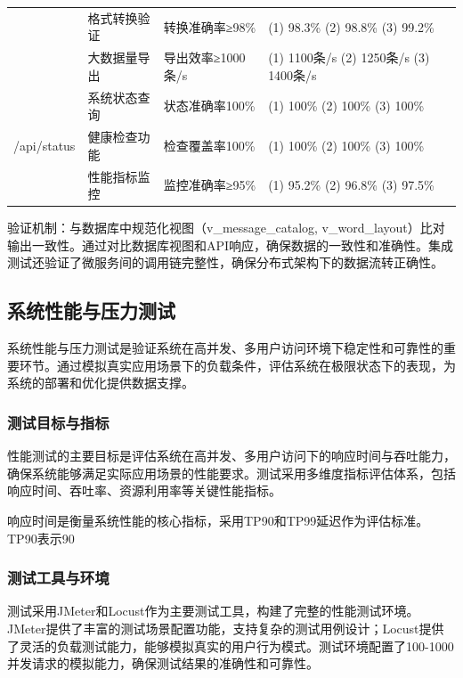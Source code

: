 \begin{table}[H]
{\begin{tabular}{|l|l|l|l|}
\cline{2-4}
& 格式转换验证 & 转换准确率≥98\% & (1) 98.3\% (2) 98.8\% (3) 99.2\% \\
\cline{2-4}
& 大数据量导出 & 导出效率≥1000条/s & (1) 1100条/s (2) 1250条/s (3) 1400条/s \\
\hline
\multirow{3}{*}{/api/status} & 系统状态查询 & 状态准确率100\% & (1) 100\% (2) 100\% (3) 100\% \\
\cline{2-4}
& 健康检查功能 & 检查覆盖率100\% & (1) 100\% (2) 100\% (3) 100\% \\
\cline{2-4}
& 性能指标监控 & 监控准确率≥95\% & (1) 95.2\% (2) 96.8\% (3) 97.5\% \\
\hline
\end{tabular}%
}
\end{table}

验证机制：与数据库中规范化视图（v\_message\_catalog, v\_word\_layout）比对输出一致性。通过对比数据库视图和API响应，确保数据的一致性和准确性。集成测试还验证了微服务间的调用链完整性，确保分布式架构下的数据流转正确性。

\subsection{系统性能与压力测试}

系统性能与压力测试是验证系统在高并发、多用户访问环境下稳定性和可靠性的重要环节。通过模拟真实应用场景下的负载条件，评估系统在极限状态下的表现，为系统的部署和优化提供数据支撑。

\subsubsection{测试目标与指标}

性能测试的主要目标是评估系统在高并发、多用户访问下的响应时间与吞吐能力，确保系统能够满足实际应用场景的性能要求。测试采用多维度指标评估体系，包括响应时间、吞吐率、资源利用率等关键性能指标。

响应时间是衡量系统性能的核心指标，采用TP90和TP99延迟作为评估标准。TP90表示90%

\subsubsection{测试工具与环境}

测试采用JMeter和Locust作为主要测试工具，构建了完整的性能测试环境。JMeter提供了丰富的测试场景配置功能，支持复杂的测试用例设计；Locust提供了灵活的负载测试能力，能够模拟真实的用户行为模式。测试环境配置了100-1000并发请求的模拟能力，确保测试结果的准确性和可靠性。

